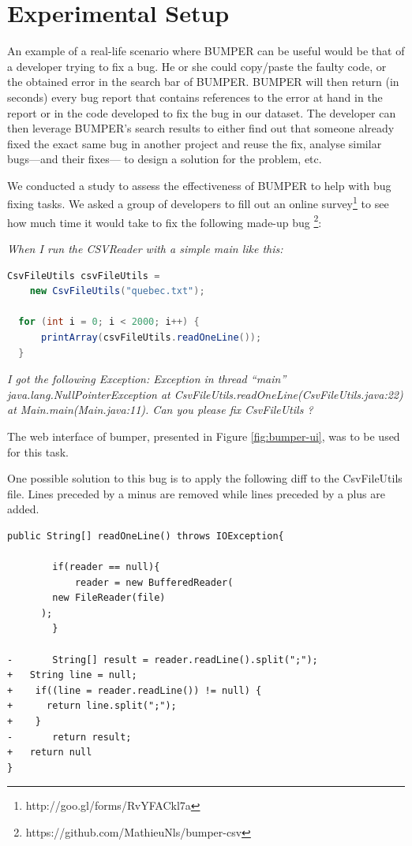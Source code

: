 \documentclass[12pt]{report}
\begin{document}
\section{Experimental Setup}\label{experimental-setup}

An example of a real-life scenario where BUMPER can be useful would be
that of a developer trying to fix a bug. He or she could copy/paste the
faulty code, or the obtained error in the search bar of BUMPER. BUMPER
will then return (in seconds) every bug report that contains references
to the error at hand in the report or in the code developed to fix the
bug in our dataset. The developer can then leverage BUMPER's search
results to either find out that someone already fixed the exact same bug
in another project and reuse the fix, analyse similar bugs---and their
fixes--- to design a solution for the problem, etc.

We conducted a study to assess the effectiveness of BUMPER to help with
bug fixing tasks. We asked a group of developers to fill out an online
survey\footnote{http://goo.gl/forms/RvYFACkl7a} to see how much time it
would take to fix the following made-up bug
\footnote{https://github.com/MathieuNls/bumper-csv}:

\emph{When I run the CSVReader with a simple main like this:}

\begin{lstlisting}[language=Java]
  CsvFileUtils csvFileUtils =
    new CsvFileUtils("quebec.txt");

  for (int i = 0; i < 2000; i++) {
      printArray(csvFileUtils.readOneLine());
  }
\end{lstlisting}

\emph{I got the following Exception: Exception in thread ``main''
java.lang.NullPointerException at
CsvFileUtils.readOneLine(CsvFileUtils.java:22) at
Main.main(Main.java:11). Can you please fix CsvFileUtils ?}

The web interface of bumper, presented in Figure \ref{fig:bumper-ui},
was to be used for this task.

One possible solution to this bug is to apply the following diff to the
CsvFileUtils file. Lines preceded by a minus are removed while lines
preceded by a plus are added.

\begin{lstlisting}
public String[] readOneLine() throws IOException{
        
        if(reader == null){
            reader = new BufferedReader(
        new FileReader(file)
      );
        }
        
-       String[] result = reader.readLine().split(";");
+   String line = null;
+    if((line = reader.readLine()) != null) {
+      return line.split(";");
+    }
-       return result;
+   return null
}
\end{lstlisting}
\end{document}
